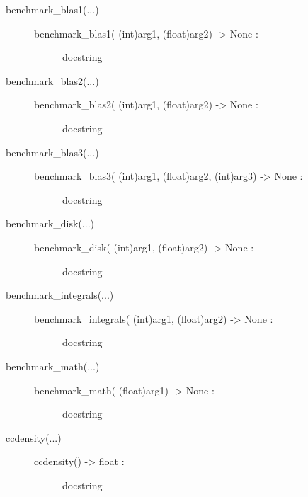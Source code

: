 \documentclass[letterpaper,10pt,english]{sphinxmanual}
\begin{document}
\begin{description}
\begin{description}
\item[{benchmark\_blas1(...)}] \leavevmode\begin{description}
\item[{benchmark\_blas1( (int)arg1, (float)arg2) -\textgreater{} None :}] \leavevmode
docstring

\end{description}

\item[{benchmark\_blas2(...)}] \leavevmode\begin{description}
\item[{benchmark\_blas2( (int)arg1, (float)arg2) -\textgreater{} None :}] \leavevmode
docstring

\end{description}

\item[{benchmark\_blas3(...)}] \leavevmode\begin{description}
\item[{benchmark\_blas3( (int)arg1, (float)arg2, (int)arg3) -\textgreater{} None :}] \leavevmode
docstring

\end{description}

\item[{benchmark\_disk(...)}] \leavevmode\begin{description}
\item[{benchmark\_disk( (int)arg1, (float)arg2) -\textgreater{} None :}] \leavevmode
docstring

\end{description}

\item[{benchmark\_integrals(...)}] \leavevmode\begin{description}
\item[{benchmark\_integrals( (int)arg1, (float)arg2) -\textgreater{} None :}] \leavevmode
docstring

\end{description}

\item[{benchmark\_math(...)}] \leavevmode\begin{description}
\item[{benchmark\_math( (float)arg1) -\textgreater{} None :}] \leavevmode
docstring

\end{description}

\item[{ccdensity(...)}] \leavevmode\begin{description}
\item[{ccdensity() -\textgreater{} float :}] \leavevmode
docstring


\end{description}
\end{description}
\end{description}
\end{document}

